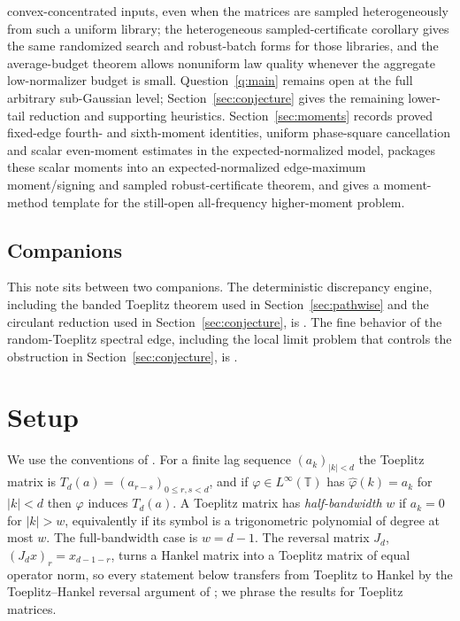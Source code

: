 \documentclass[11pt]{amsart}
\numberwithin{equation}{section}
\theoremstyle{definition}
\theoremstyle{remark}
\newcommand{\T}{\mathbb T}
\newcommand{\wh}{\widehat}
\newcommand{\abs}[1]{\left\lvert #1\right\rvert}
\begin{document}
convex-concentrated inputs, even when the matrices are sampled heterogeneously
from such a uniform library; the
heterogeneous sampled-certificate corollary gives the same randomized search and
robust-batch forms for those libraries, and the average-budget theorem allows
nonuniform law quality whenever the aggregate low-normalizer budget is small.
Question~\ref{q:main} remains open at
the full arbitrary sub-Gaussian level; Section~\ref{sec:conjecture} gives the
remaining lower-tail reduction and supporting heuristics. Section~\ref{sec:moments}
records proved fixed-edge fourth- and sixth-moment identities, uniform
phase-square cancellation and scalar even-moment estimates in the
expected-normalized model, packages these scalar moments into an
expected-normalized edge-maximum moment/signing and sampled robust-certificate
theorem, and gives a
moment-method template for the still-open all-frequency higher-moment problem.

\subsection*{Companions} This note sits between two companions. The
deterministic discrepancy engine, including the banded Toeplitz theorem used in
Section~\ref{sec:pathwise} and the circulant reduction used in
Section~\ref{sec:conjecture}, is \cite{Shmalo-paper12}. The fine behavior of the
random-Toeplitz spectral edge, including the local limit problem that controls
the obstruction in Section~\ref{sec:conjecture}, is \cite{Shmalo-paper5}.

\section{Setup}

We use the conventions of \cite{Shmalo-paper12}. For a finite lag sequence
$(a_k)_{\abs k<d}$ the Toeplitz matrix is $T_d(a)=(a_{r-s})_{0\le r,s<d}$, and if
$\varphi\in L^\infty(\T)$ has $\wh\varphi(k)=a_k$ for $\abs k<d$ then $\varphi$
induces $T_d(a)$. A Toeplitz matrix has \emph{half-bandwidth} $w$ if $a_k=0$ for
$\abs k>w$, equivalently if its symbol is a trigonometric polynomial of degree at
most $w$. The full-bandwidth case is $w=d-1$. The reversal matrix $J_d$,
$(J_dx)_r=x_{d-1-r}$, turns a Hankel matrix into a Toeplitz matrix of equal
operator norm, so every statement below transfers from Toeplitz to Hankel by the
Toeplitz--Hankel reversal argument of \cite{Shmalo-paper12}; we phrase the results for Toeplitz
matrices.
\end{document}
